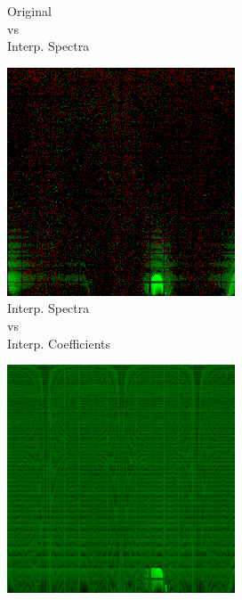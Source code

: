 \begin{figure}[t]
\begin{subfigure}[t]{0.22\textwidth}
		\caption{Original\\vs\\Interp. Spectra}
		\label{fig:sigDiffOrigSpectra}
	\end{subfigure}\hspace{0.1em}
	\begin{subfigure}[t]{0.22\textwidth}
		\includegraphics[width=\linewidth]{img/uplifting_diff_spectraCoeffs.png}
		\caption{Interp. Spectra\\vs\\Interp. Coefficients}
		\label{fig:sigDiffSpectraCoeffs}
	\end{subfigure} \hspace{0.1em}
	\begin{subfigure}[t]{0.22\textwidth}
		\includegraphics[width=\linewidth]{img/uplifting_diff_spectraNeighbor.png}

\end{subfigure}
\end{figure}

